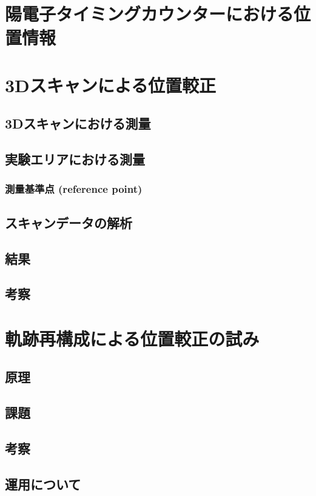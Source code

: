\documentclass[Yonemoto_master.tex]{subfiles}
\begin{document}
\chapter{陽電子タイミングカウンターにおける位置情報}

\chapter{3Dスキャンによる位置較正}
\section{3Dスキャンにおける測量}
\section{実験エリアにおける測量}
\subsection{測量基準点 (reference point)}
\section{スキャンデータの解析}
\section{結果}
\section{考察}

\chapter{軌跡再構成による位置較正の試み}
\section{原理}
\section{課題}
\section{考察}
\section{運用について}
\end{document}
